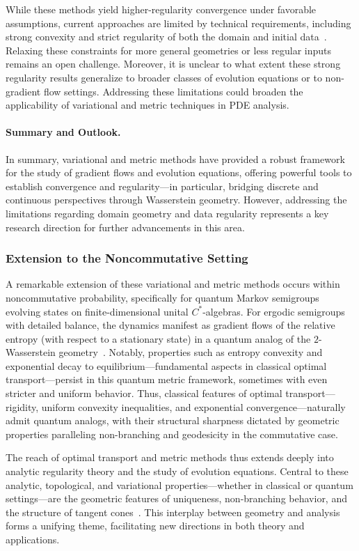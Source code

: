 \documentclass[sigconf]{acmart}
\begin{document}
While these methods yield higher-regularity convergence under favorable assumptions, current approaches are limited by technical requirements, including strong convexity and strict regularity of both the domain and initial data~\cite{ref96}. Relaxing these constraints for more general geometries or less regular inputs remains an open challenge. Moreover, it is unclear to what extent these strong regularity results generalize to broader classes of evolution equations or to non-gradient flow settings. Addressing these limitations could broaden the applicability of variational and metric techniques in PDE analysis.

\paragraph{Summary and Outlook.} In summary, variational and metric methods have provided a robust framework for the study of gradient flows and evolution equations, offering powerful tools to establish convergence and regularity—in particular, bridging discrete and continuous perspectives through Wasserstein geometry. However, addressing the limitations regarding domain geometry and data regularity represents a key research direction for further advancements in this area.

\subsubsection{Extension to the Noncommutative Setting}

A remarkable extension of these variational and metric methods occurs within noncommutative probability, specifically for quantum Markov semigroups evolving states on finite-dimensional unital $C^*$-algebras. For ergodic semigroups with detailed balance, the dynamics manifest as gradient flows of the relative entropy (with respect to a stationary state) in a quantum analog of the $2$-Wasserstein geometry~\cite{ref97}. Notably, properties such as entropy convexity and exponential decay to equilibrium—fundamental aspects in classical optimal transport—persist in this quantum metric framework, sometimes with even stricter and uniform behavior. Thus, classical features of optimal transport—rigidity, uniform convexity inequalities, and exponential convergence—naturally admit quantum analogs, with their structural sharpness dictated by geometric properties paralleling non-branching and geodesicity in the commutative case.

\vspace{1em}
\noindent
The reach of optimal transport and metric methods thus extends deeply into analytic regularity theory and the study of evolution equations. Central to these analytic, topological, and variational properties—whether in classical or quantum settings—are the geometric features of uniqueness, non-branching behavior, and the structure of tangent cones~\cite{ref96,ref97,ref107}. This interplay between geometry and analysis forms a unifying theme, facilitating new directions in both theory and applications.
\end{document}

